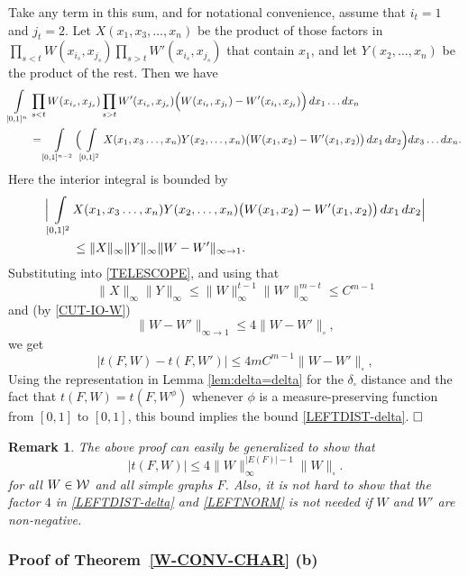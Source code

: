 \documentclass[12pt]{article}
\newtheorem{remark}[theorem]{Remark}
\numberwithin{equation}{section}
\begin{document}
Take any term in this sum, and for notational convenience, assume
that $i_t=1$ and $j_t=2$. Let $X(x_1,x_3,\dots,x_n)$ be the product
of those factors in $\prod_{s<t} W(x_{i_s},x_{j_s}) \prod_{s>t}
W'(x_{i_s},x_{j_s})$ that contain $x_1$, and let $Y(x_2,\dots,x_n)$
be the product of the rest. Then we have
\begin{align*}
\int\limits_{[0,1]^n}& \prod_{s<t} W(x_{i_s},x_{j_s})
\prod_{s>t}W'(x_{i_s},x_{j_s}) \Bigl(W(x_{i_t},x_{j_t})-
W'(x_{i_t},x_{j_t})\Bigr)\,dx_1\dots dx_n \\ &=
\int\limits_{[0,1]^{n-2}} \Bigl(\int\limits_{[0,1]^2}
X(x_1,x_3\dots,x_n)Y(x_2,\dots,x_n) \bigl(W(x_1,x_2)-
W'(x_1,x_2)\bigr)\,dx_1\,dx_2\Bigr) dx_3 \dots dx_n.
\end{align*}
Here the interior integral is bounded by
\begin{align*}
\Bigl|\int\limits_{[0,1]^2}  &X(x_1,x_3\dots,x_n)Y(x_2,\dots,x_n)
\bigl(W(x_1,x_2)-
W'(x_1,x_2)\bigr)\,dx_1\,dx_2\Bigr|
\\&
\le \|X\|_\infty \|Y\|_\infty\|W-W'\|_{\infty\to 1}.
\end{align*}
Substituting into \eqref{TELESCOPE}, and
using that
\[
\|X\|_\infty\|Y\|_\infty \leq
\|W\|_\infty^{t-1}\|W'\|_\infty^{m-t}\le C^{m-1}
\]
and (by \eqref{CUT-IO-W})
\[
\|W-W'\|_{\infty\to 1}\le 4 \|W-W'\|_\square,
\]
we get
\[
|t(F,W)-t(F,W')|\le 4 mC^{m-1}\|W-W'\|_\square,
\]
Using the representation in Lemma \ref{lem:delta=delta} for the
$\delta_\square$ distance and the fact that $t(F,W)=t(F,W^\phi)$
whenever $\phi$ is a measure-preserving function from $[0,1]$ to
$[0,1]$, this bound implies the bound \eqref{LEFTDIST-delta}.
$\hfill\square$

\begin{remark}
The above proof can easily be generalized to show
that \begin{equation}
\label{LEFTNORM} |t(F,W)|\le { 4 \|W\|_\infty^{|E(F)|-1}}
\|W\|_\square.
\end{equation}
for all $W\in{\cal W}$ and all simple graphs $F$.
Also, it is not hard to show
that the factor $4$ in \eqref{LEFTDIST-delta} and \eqref{LEFTNORM}
is not needed if $W$ and $W'$ are non-negative.
\end{remark}


\subsubsection{Proof of Theorem~\ref{W-CONV-CHAR} (b)}
\label{sec:left-vs-metric-conv}
\end{document}
